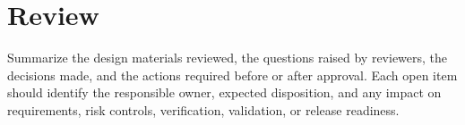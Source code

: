 \section{Review}
Summarize the design materials reviewed, the questions raised by reviewers, the
decisions made, and the actions required before or after approval.  Each open
item should identify the responsible owner, expected disposition, and any impact
on requirements, risk controls, verification, validation, or release readiness.
